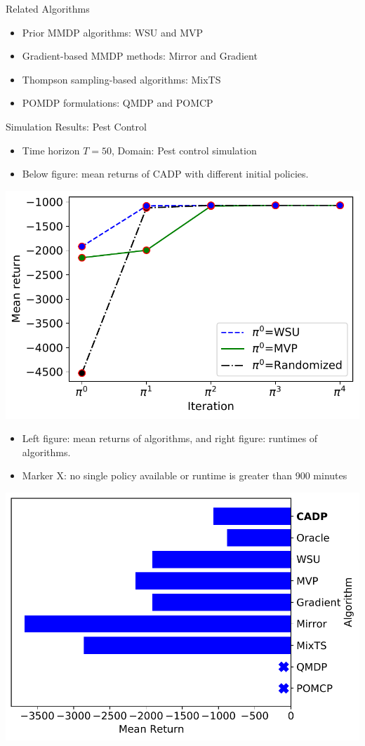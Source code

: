 
\begin{block}{Related Algorithms}
\begin{itemize}
    \item Prior MMDP algorithms: WSU and MVP
    \item Gradient-based MMDP methods: Mirror and Gradient
    \item Thompson sampling-based algorithms: MixTS
    \item POMDP formulations: QMDP and POMCP
\end{itemize}
\end{block}


\begin{block}{Simulation Results: Pest Control}
\begin{itemize}
    \item Time horizon $T = 50$, Domain: Pest control simulation
    \item Below figure: mean returns of CADP with different initial policies. 
\end{itemize}
\begin{center}
    \includegraphics[width=0.6\linewidth]{fig/initial_returns.pdf}
  \end{center}
\begin{itemize}
   \item Left figure: mean returns of algorithms, and right figure: runtimes of algorithms. 
   \item Marker X: no single policy available or runtime is greater than 900 minutes
\end{itemize}
\vspace{0.2cm}
\begin{center}
    \includegraphics[width=0.49\linewidth]{fig/mean_return.pdf}

\end{center}
\end{block}
